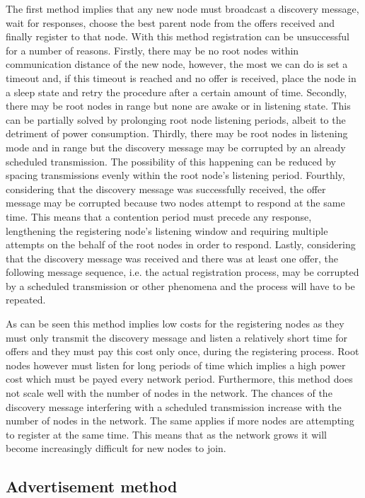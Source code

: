 The first method implies that any new node must broadcast a discovery message,
wait for responses, choose the best parent node from the offers received and
finally register to that node. With this method registration can be
unsuccessful for a number of reasons. Firstly, there may be no root nodes
within communication distance of the new node, however, the most we can do is
set a timeout and, if this timeout is reached and no offer is received, place
the node in a sleep state and retry the procedure after a certain amount of
time. Secondly, there may be root nodes in range but none are awake or in
listening state. This can be partially solved by prolonging root node listening
periods, albeit to the detriment of power consumption. Thirdly, there may be
root nodes in listening mode and in range but the discovery message may be
corrupted by an already scheduled transmission. The possibility of this
happening can be reduced by spacing transmissions evenly within the root node's
listening period. Fourthly, considering that the discovery message was
successfully received, the offer message may be corrupted because two nodes
attempt to respond at the same time. This means that a contention period must
precede any response, lengthening the registering node's listening window and
requiring multiple attempts on the behalf of the root nodes in order to
respond. Lastly, considering that the discovery message was received and there
was at least one offer, the following message sequence, i.e. the actual
registration process, may be corrupted by a scheduled transmission or other
phenomena and the process will have to be repeated.

As can be seen this method implies low costs for the registering nodes as they
must only transmit the discovery message and listen a relatively short time for
offers and they must pay this cost only once, during the registering process.
Root nodes however must listen for long periods of time which implies a high
power cost which must be payed every network period. Furthermore, this method
does not scale well with the number of nodes in the network. The chances of the
discovery message interfering with a scheduled transmission increase with the
number of nodes in the network. The same applies if more nodes are attempting
to register at the same time. This means that as the network grows it will
become increasingly difficult for new nodes to join.

\subsection{Advertisement method}
\label{subsec:advertisement_method}

